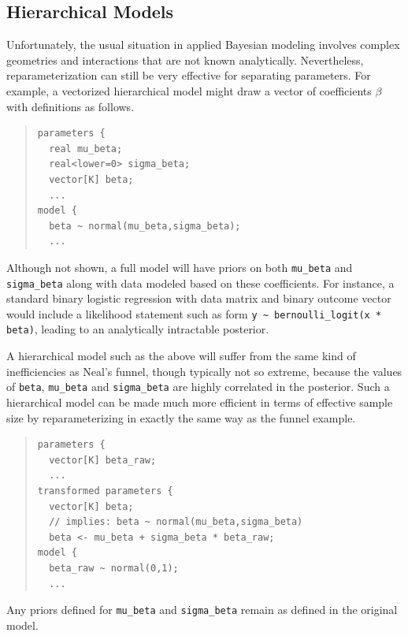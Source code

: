 \subsection{Hierarchical Models}

Unfortunately, the usual situation in applied Bayesian modeling
involves complex geometries and interactions that are not known
analytically.  Nevertheless, reparameterization can still be very
effective for separating parameters.  For example, a vectorized
hierarchical model might draw a vector of coefficients $\beta$ with
definitions as follows.
%
\begin{quote}
\begin{Verbatim}
parameters {
  real mu_beta;   
  real<lower=0> sigma_beta;
  vector[K] beta;
  ...
model {
  beta ~ normal(mu_beta,sigma_beta);
  ...
\end{Verbatim}
\end{quote}
%
Although not shown, a full model will have priors on both
\Verb|mu_beta| and \Verb|sigma_beta| along with data modeled based on
these coefficients.  For instance, a standard binary logistic
regression with data matrix  and binary outcome vector
 would include a likelihood statement such as form
\Verb|y ~ bernoulli_logit(x * beta)|, leading to an analytically
intractable posterior.

A hierarchical model such as the above will suffer from the same kind
of inefficiencies as Neal's funnel, though typically not so extreme,
because the values of \Verb|beta|, \Verb|mu_beta| and
\Verb|sigma_beta| are highly correlated in the posterior.  Such a
hierarchical model can be made much more efficient in terms of
effective sample size by reparameterizing in exactly the same way as
the funnel example.
%
\begin{quote}
\begin{Verbatim}
parameters {
  vector[K] beta_raw;
  ...
transformed parameters {
  vector[K] beta;
  // implies: beta ~ normal(mu_beta,sigma_beta)
  beta <- mu_beta + sigma_beta * beta_raw;
model {
  beta_raw ~ normal(0,1);  
  ...
\end{Verbatim}
\end{quote}
%
Any priors defined for \Verb|mu_beta| and \Verb|sigma_beta| remain as
defined in the original model.

